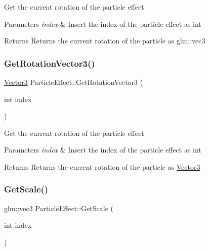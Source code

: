 Get the current rotation of the particle effect 
\begin{DoxyParams}{Parameters}
{\em index} & Insert the index of the particle effect as int \\
\hline
\end{DoxyParams}
\begin{DoxyReturn}{Returns}
Returns the current rotation of the particle as glm\+::vec3 
\end{DoxyReturn}
\mbox{\label{class_particle_effect_a48bdcec118c008cdfdd6aaf543af81e6}} 
\subsubsection{\texorpdfstring{GetRotationVector3()}{GetRotationVector3()}}
{\footnotesize\ttfamily \mbox{\hyperlink{struct_vector3}{Vector3}} Particle\+Effect\+::\+Get\+Rotation\+Vector3 (\begin{DoxyParamCaption}\item[{int}]{index }\end{DoxyParamCaption})}

Get the current rotation of the particle effect 
\begin{DoxyParams}{Parameters}
{\em index} & Insert the index of the particle effect as int \\
\hline
\end{DoxyParams}
\begin{DoxyReturn}{Returns}
Returns the current rotation of the particle as \mbox{\hyperlink{struct_vector3}{Vector3}} 
\end{DoxyReturn}
\mbox{\label{class_particle_effect_a7c6942ff4bad2193f97221b82d7a0b4a}} 
\subsubsection{\texorpdfstring{GetScale()}{GetScale()}}
{\footnotesize\ttfamily glm\+::vec3 Particle\+Effect\+::\+Get\+Scale (\begin{DoxyParamCaption}\item[{int}]{index }\end{DoxyParamCaption})}

